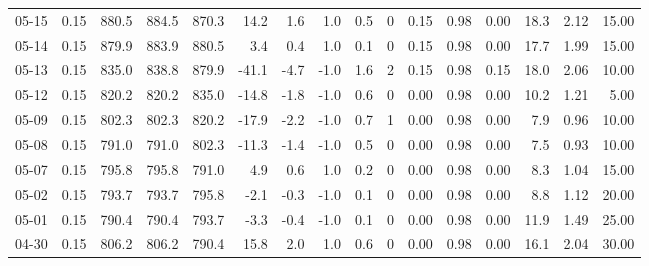 \begin{threeparttable}
{\begin{tabular}{lrrrrrrrrrrrrrrr}
  05-15 &     0.15 & 880.5 & 884.5 & 870.3 &       14.2 &            1.6 &                      1.0 &                 0.5 &              0 &       0.15 &      0.98 &           0.00 &             18.3 &            2.12 &                  15.00 \\
  05-14 &     0.15 & 879.9 & 883.9 & 880.5 &        3.4 &            0.4 &                      1.0 &                 0.1 &              0 &       0.15 &      0.98 &           0.00 &             17.7 &            1.99 &                  15.00 \\
  05-13 &     0.15 & 835.0 & 838.8 & 879.9 &      -41.1 &           -4.7 &                     -1.0 &                 1.6 &              2 &       0.15 &      0.98 &           0.15 &             18.0 &            2.06 &                  10.00 \\
  05-12 &     0.15 & 820.2 & 820.2 & 835.0 &      -14.8 &           -1.8 &                     -1.0 &                 0.6 &              0 &       0.00 &      0.98 &           0.00 &             10.2 &            1.21 &                   5.00 \\
  05-09 &     0.15 & 802.3 & 802.3 & 820.2 &      -17.9 &           -2.2 &                     -1.0 &                 0.7 &              1 &       0.00 &      0.98 &           0.00 &              7.9 &            0.96 &                  10.00 \\
  05-08 &     0.15 & 791.0 & 791.0 & 802.3 &      -11.3 &           -1.4 &                     -1.0 &                 0.5 &              0 &       0.00 &      0.98 &           0.00 &              7.5 &            0.93 &                  10.00 \\
  05-07 &     0.15 & 795.8 & 795.8 & 791.0 &        4.9 &            0.6 &                      1.0 &                 0.2 &              0 &       0.00 &      0.98 &           0.00 &              8.3 &            1.04 &                  15.00 \\
  05-02 &     0.15 & 793.7 & 793.7 & 795.8 &       -2.1 &           -0.3 &                     -1.0 &                 0.1 &              0 &       0.00 &      0.98 &           0.00 &              8.8 &            1.12 &                  20.00 \\
  05-01 &     0.15 & 790.4 & 790.4 & 793.7 &       -3.3 &           -0.4 &                     -1.0 &                 0.1 &              0 &       0.00 &      0.98 &           0.00 &             11.9 &            1.49 &                  25.00 \\
  04-30 &     0.15 & 806.2 & 806.2 & 790.4 &       15.8 &            2.0 &                      1.0 &                 0.6 &              0 &       0.00 &      0.98 &           0.00 &             16.1 &            2.04 &                  30.00 \\

\end{tabular}}
\end{threeparttable}

